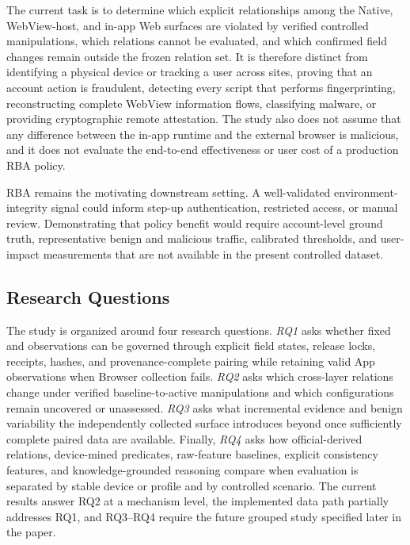 The current task is to determine which explicit relationships among the Native, WebView-host, and in-app Web surfaces are violated by verified controlled manipulations, which relations cannot be evaluated, and which confirmed field changes remain outside the frozen relation set. It is therefore distinct from identifying a physical device or tracking a user across sites, proving that an account action is fraudulent, detecting every script that performs fingerprinting, reconstructing complete WebView information flows, classifying malware, or providing cryptographic remote attestation. The study also does not assume that any difference between the in-app runtime and the external browser is malicious, and it does not evaluate the end-to-end effectiveness or user cost of a production RBA policy.

RBA remains the motivating downstream setting. A well-validated environment-integrity signal could inform step-up authentication, restricted access, or manual review. Demonstrating that policy benefit would require account-level ground truth, representative benign and malicious traffic, calibrated thresholds, and user-impact measurements that are not available in the present controlled dataset.

\subsection{Research Questions}

The study is organized around four research questions. \emph{RQ1} asks whether fixed \appfp and \browserfp observations can be governed through explicit field states, release locks, receipts, hashes, and provenance-complete pairing while retaining valid App observations when Browser collection fails. \emph{RQ2} asks which cross-layer \appfp relations change under verified baseline-to-active manipulations and which configurations remain uncovered or unassessed. \emph{RQ3} asks what incremental evidence and benign variability the independently collected \browserfp surface introduces beyond \appfp once sufficiently complete paired data are available. Finally, \emph{RQ4} asks how official-derived relations, device-mined predicates, raw-feature baselines, explicit consistency features, and knowledge-grounded reasoning compare when evaluation is separated by stable device or profile and by controlled scenario. The current results answer RQ2 at a mechanism level, the implemented data path partially addresses RQ1, and RQ3--RQ4 require the future grouped study specified later in the paper.
